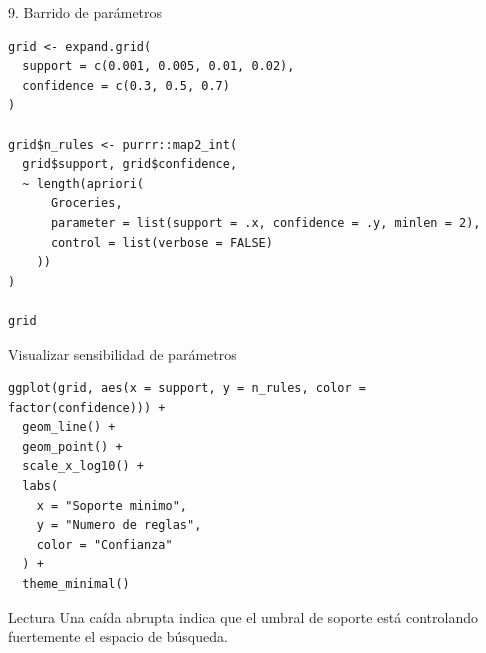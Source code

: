 \documentclass[10pt,aspectratio=169]{beamer}
\begin{document}
\begin{frame}[fragile]{9. Barrido de parámetros}
\begin{lstlisting}[style=rcode]
grid <- expand.grid(
  support = c(0.001, 0.005, 0.01, 0.02),
  confidence = c(0.3, 0.5, 0.7)
)

grid$n_rules <- purrr::map2_int(
  grid$support, grid$confidence,
  ~ length(apriori(
      Groceries,
      parameter = list(support = .x, confidence = .y, minlen = 2),
      control = list(verbose = FALSE)
    ))
)

grid
\end{lstlisting}
\end{frame}

\begin{frame}[fragile]{Visualizar sensibilidad de parámetros}
\begin{lstlisting}[style=rcode]
ggplot(grid, aes(x = support, y = n_rules, color = factor(confidence))) +
  geom_line() +
  geom_point() +
  scale_x_log10() +
  labs(
    x = "Soporte minimo",
    y = "Numero de reglas",
    color = "Confianza"
  ) +
  theme_minimal()
\end{lstlisting}

\begin{block}{Lectura}
Una caída abrupta indica que el umbral de soporte está controlando fuertemente el espacio de búsqueda.
\end{block}
\end{frame}


\end{document}
